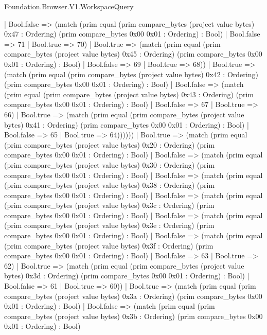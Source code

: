 \begin{lexlean}{Foundation.Browser.V1.WorkspaceQuery}
\begin{semanticmodule}
{                  | Bool.false => (match (prim equal (prim compare_bytes (project value bytes) 0x47 : Ordering) (prim compare_bytes 0x00 0x01 : Ordering) : Bool)
                    | Bool.false => 71
                    | Bool.true => 70)
                  | Bool.true => (match (prim equal (prim compare_bytes (project value bytes) 0x45 : Ordering) (prim compare_bytes 0x00 0x01 : Ordering) : Bool)
                    | Bool.false => 69
                    | Bool.true => 68))
                | Bool.true => (match (prim equal (prim compare_bytes (project value bytes) 0x42 : Ordering) (prim compare_bytes 0x00 0x01 : Ordering) : Bool)
                  | Bool.false => (match (prim equal (prim compare_bytes (project value bytes) 0x43 : Ordering) (prim compare_bytes 0x00 0x01 : Ordering) : Bool)
                    | Bool.false => 67
                    | Bool.true => 66)
                  | Bool.true => (match (prim equal (prim compare_bytes (project value bytes) 0x41 : Ordering) (prim compare_bytes 0x00 0x01 : Ordering) : Bool)
                    | Bool.false => 65
                    | Bool.true => 64))))))
        | Bool.true => (match (prim equal (prim compare_bytes (project value bytes) 0x20 : Ordering) (prim compare_bytes 0x00 0x01 : Ordering) : Bool)
          | Bool.false => (match (prim equal (prim compare_bytes (project value bytes) 0x30 : Ordering) (prim compare_bytes 0x00 0x01 : Ordering) : Bool)
            | Bool.false => (match (prim equal (prim compare_bytes (project value bytes) 0x38 : Ordering) (prim compare_bytes 0x00 0x01 : Ordering) : Bool)
              | Bool.false => (match (prim equal (prim compare_bytes (project value bytes) 0x3c : Ordering) (prim compare_bytes 0x00 0x01 : Ordering) : Bool)
                | Bool.false => (match (prim equal (prim compare_bytes (project value bytes) 0x3e : Ordering) (prim compare_bytes 0x00 0x01 : Ordering) : Bool)
                  | Bool.false => (match (prim equal (prim compare_bytes (project value bytes) 0x3f : Ordering) (prim compare_bytes 0x00 0x01 : Ordering) : Bool)
                    | Bool.false => 63
                    | Bool.true => 62)
                  | Bool.true => (match (prim equal (prim compare_bytes (project value bytes) 0x3d : Ordering) (prim compare_bytes 0x00 0x01 : Ordering) : Bool)
                    | Bool.false => 61
                    | Bool.true => 60))
                | Bool.true => (match (prim equal (prim compare_bytes (project value bytes) 0x3a : Ordering) (prim compare_bytes 0x00 0x01 : Ordering) : Bool)
                  | Bool.false => (match (prim equal (prim compare_bytes (project value bytes) 0x3b : Ordering) (prim compare_bytes 0x00 0x01 : Ordering) : Bool)
}
\end{semanticmodule}
\end{lexlean}
